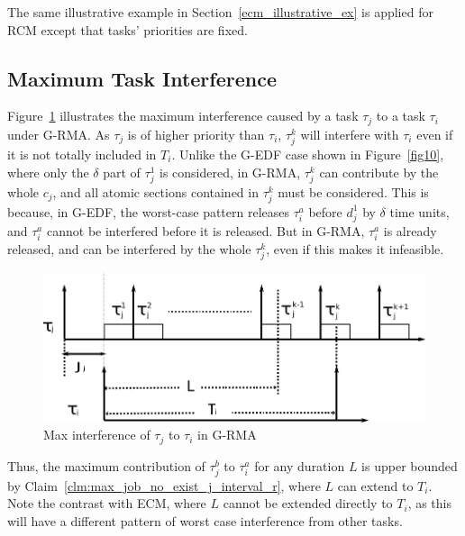 The same illustrative example in Section~\ref{ecm_illustrative_ex} is applied for RCM except that tasks' priorities are fixed.
%
\subsection{Maximum Task Interference}
%
Figure~\ref{fig11} illustrates the maximum interference caused by a task $\tau_{j}$
to a task $\tau_{i}$ under G-RMA. As $\tau_{j}$ is of higher priority than $\tau_{i}$,
$\tau_{j}^{k}$ will interfere with $\tau_{i}$ even if it is not totally
included in $T_{i}$. Unlike the G-EDF case shown in Figure~\ref{fig10}, 
where only the $\delta$ part of $\tau_{j}^{1}$ is considered, in G-RMA,
$\tau_{j}^{k}$ can contribute by the whole $c_{j}$, and all atomic
sections contained in $\tau_{j}^{k}$ must be considered. This is because, in G-EDF, the worst-case pattern releases $\tau_{i}^a$ before $d_{j}^{1}$
by $\delta$ time units, and $\tau_{i}^a$ cannot be interfered before it
is released. But in G-RMA, $\tau_{i}^a$ is already released, and can be
interfered by the whole $\tau_{j}^{k}$, even if this makes it infeasible.
%
\begin{figure}[htbp]
\centering
\includegraphics[scale=0.5]{figures/figure11}\caption{\label{fig11}Max interference of $\tau_{j}$ to $\tau_{i}$ in G-RMA}
\end{figure}

Thus, the maximum contribution of $\tau_{j}^b$ to $\tau_{i}^a$ for any duration
$L$ is upper bounded by Claim~\ref{clm:max_job_no_exist_j_interval_r}, where $L$ can extend to $T_{i}$. Note the contrast with ECM, where $L$ cannot be extended directly to $T_i$, as this will have a different pattern of worst case interference from other tasks.
%
